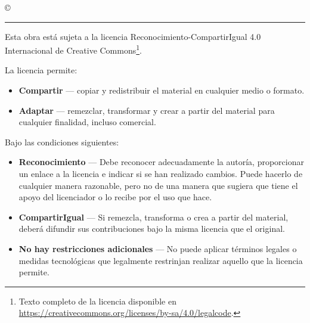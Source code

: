 \thispagestyle{empty}

\hfill

\vfill

\textit{\myTitle} \copyright\ \myTime \myName \\ \bigskip

\par\vspace*{\dimexpr-\parskip-\baselineskip+6pt}
\noindent\rule{\textwidth}{0.5pt}

Esta obra está sujeta a la licencia Reconocimiento-CompartirIgual 4.0 Internacional de Creative Commons\footnote{Texto completo de la licencia disponible en \url{https://creativecommons.org/licenses/by-sa/4.0/legalcode}.}.

La licencia permite:
\begin{itemize}
	\item[] \textbf{Compartir} --- copiar y redistribuir el material en cualquier medio o formato.
	\item[] \textbf{Adaptar} --- remezclar, transformar y crear a partir del material
para cualquier finalidad, incluso comercial.
\end{itemize}

Bajo las condiciones siguientes:
\begin{itemize}
	\item[] \textbf{Reconocimiento} --- Debe reconocer adecuadamente la autoría, proporcionar un enlace a la licencia e indicar si se han realizado cambios. Puede hacerlo de cualquier manera razonable, pero no de una manera que sugiera que tiene el apoyo del licenciador o lo recibe por el uso que hace. 
	\item[] \textbf{CompartirIgual} --- Si remezcla, transforma o crea a partir del material, deberá difundir sus contribuciones bajo la misma licencia que el original.
	\item[] \textbf{No hay restricciones adicionales} --- No puede aplicar términos legales o medidas tecnológicas que legalmente restrinjan realizar aquello que la licencia permite.
\end{itemize}
\clearpage